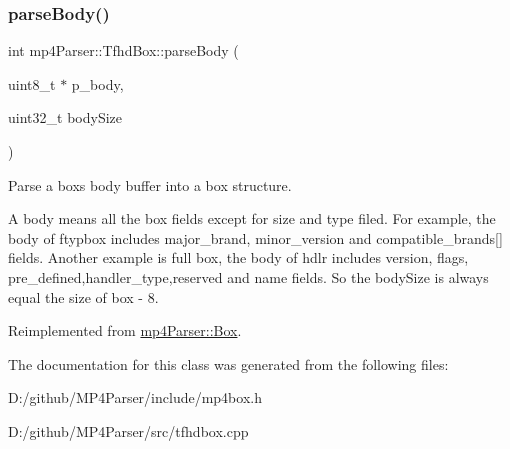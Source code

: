 \subsubsection{\texorpdfstring{parseBody()}{parseBody()}}
{\footnotesize\ttfamily int mp4\+Parser\+::\+Tfhd\+Box\+::parse\+Body (\begin{DoxyParamCaption}\item[{uint8\+\_\+t $\ast$}]{p\+\_\+body,  }\item[{uint32\+\_\+t}]{body\+Size }\end{DoxyParamCaption})\hspace{0.3cm}{\ttfamily [virtual]}}



Parse a box\textquotesingle{}s body buffer into a box structure. 

A body means all the box fields except for size and type filed. For example, the body of ftypbox includes major\+\_\+brand, minor\+\_\+version and compatible\+\_\+brands\mbox{[}\mbox{]} fields. Another example is full box, the body of hdlr includes version, flags, pre\+\_\+defined,handler\+\_\+type,reserved and name fields. So the body\+Size is always equal the size of box -\/ 8. 

Reimplemented from \mbox{\hyperlink{classmp4_parser_1_1_box_a3dd0c084ac65bc77b69ac5ecaf796cb2}{mp4\+Parser\+::\+Box}}.



The documentation for this class was generated from the following files\+:\begin{DoxyCompactItemize}
\item 
D\+:/github/\+M\+P4\+Parser/include/mp4box.\+h\item 
D\+:/github/\+M\+P4\+Parser/src/tfhdbox.\+cpp\end{DoxyCompactItemize}
